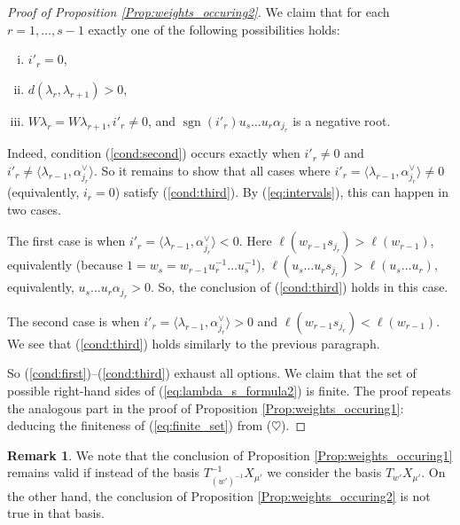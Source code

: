 \documentclass{amsart}
\theoremstyle{definition}
\newtheorem{Rem}[Thm]{Remark}
\numberwithin{equation}{section}
\begin{document}
\begin{proof}[Proof of Proposition \ref{Prop:weights_occuring2}]
We claim that for each $r=1,\ldots,s-1$ exactly one of the following possibilities holds:
\begin{enumerate}[(i)]
\item $i'_r=0$,\label{cond:first}
\item $d(\lambda_{r},\lambda_{r+1})>0$,\label{cond:second}
\item $W\lambda_r=W\lambda_{r+1}, i'_r\neq 0$, and $\operatorname{sgn}(i'_r)u_s\ldots u_r \alpha_{j_r}$ is a negative root. \label{cond:third}
\end{enumerate}
Indeed, condition (\ref{cond:second}) occurs exactly when $i'_r\neq 0$ and $i'_r\neq \langle\lambda_{r-1},\alpha_{j_r}^\vee\rangle$. So it remains to show that all cases where $i'_r=\langle\lambda_{r-1},\alpha_{j_r}^\vee\rangle\neq 0$ (equivalently, $i_r=0$) satisfy (\ref{cond:third}). By (\ref{eq:intervals}), this can happen in two cases.

The first case is when $i'_r=\langle \lambda_{r-1}, \alpha^\vee_{j_r}\rangle< 0$. Here $\ell(w_{r-1}s_{j_r})>\ell(w_{r-1})$, equivalently (because $1=w_s=w_{r-1}u_r^{-1}\ldots u_s^{-1}$), $\ell(u_s\ldots u_r s_{j_r})>\ell(u_s\ldots u_r)$, equivalently, $u_s\ldots u_r \alpha_{j_r}>0$. So, the conclusion of  (\ref{cond:third}) holds in this case.

The second case is when $i'_r=\langle \lambda_{r-1}, \alpha^\vee_{j_r}\rangle>0$ and $\ell(w_{r-1}s_{j_r})<\ell(w_{r-1})$. We see that  (\ref{cond:third}) holds similarly to the previous paragraph.

So (\ref{cond:first})--(\ref{cond:third}) exhaust all options. We claim that the set of possible right-hand sides of (\ref{eq:lambda_s_formula2}) is finite. The proof repeats the analogous part in the proof of Proposition \ref{Prop:weights_occuring1}: deducing the finiteness of (\ref{eq:finite_set}) from ($\heartsuit$).
\end{proof}

\begin{Rem}\label{Rem:weights_occuring1}
We note that the conclusion of Proposition \ref{Prop:weights_occuring1} remains valid if instead of the basis $T_{(w')^{-1}}^{-1}X_{\mu'}$ we consider the basis $T_{w'}X_{\mu'}$. On the other hand, the conclusion of Proposition \ref{Prop:weights_occuring2} is not true in that basis.
\end{Rem}
\end{document}
